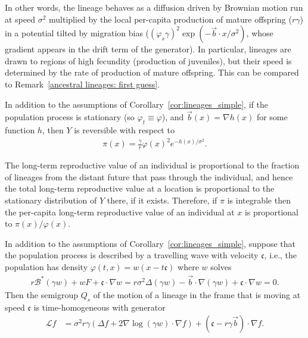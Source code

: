 \documentclass[EJP]{ejpecp} %
\newcommand{\grad}{\nabla}
\newcommand{\DG}{\mathcal{B}}  %
\newcommand{\meanq}{\vec b}    %
\newcommand{\wavespeed}{\mathfrak{c}}    %
\newcommand{\Lgen}{\mathcal{L}}    %
\newcommand{\comment}[1]{{\color{blue} \it #1}}
\begin{document}
In other words, 
the lineage behaves as a diffusion driven by Brownian motion 
run at speed $\sigma^2$ multiplied by the local per-capita production of 
mature offspring ($r \gamma$)
in a potential tilted by migration bias
($(\varphi_s \gamma)^2 \exp(-\meanq \cdot x / \sigma^2)$,
whose gradient appears in the drift term of the generator).
In particular, lineages are drawn to regions of high fecundity (production of juveniles), but their
speed is determined by the rate of production of mature offspring.
This can be compared to Remark~\ref{ancestral lineages: first guess}.

\begin{corollary} \label{cor:stationary_dist}
    In addition to the assumptions of Corollary~\ref{cor:lineages_simple},
    if the population process is stationary (so $\varphi_t \equiv \varphi$),
    and $\meanq(x) = \grad h(x)$ for some function $h$,
    then $Y$ is reversible with respect to
    \begin{align}
        \pi(x)
        =
        \frac{\gamma}{r} \varphi(x)^2 e^{-h(x) / \sigma^2} .
    \end{align}
\end{corollary}

The long-term reproductive value of an individual
is proportional to the fraction of lineages from the distant future that pass through the individual,
and hence the total long-term reproductive value at a location is proportional to
the stationary distribution of $Y$ there, if it exists.
Therefore,
if $\pi$ is integrable then the per-capita long-term reproductive value of an individual at $x$
is proportional to $\pi(x) / \varphi(x)$.

\begin{corollary} \label{cor:wavefront}
    In addition to the assumptions of Corollary~\ref{cor:lineages_simple},
    suppose that the population process is described by a travelling wave with 
velocity $\wavespeed$,
    i.e., the population has density
    $\varphi(t, x) = w(x - t \wavespeed)$
    where $w$ solves
    \begin{align*}
        r \DG^* (\gamma w) + w F + \wavespeed \cdot \grad w = 
r\sigma^2\Delta (\gamma w) -\meanq \cdot\grad (\gamma w) +\wavespeed \cdot \grad w =0 .
    \end{align*}
    Then the semigroup $Q_s$
    of the motion of a lineage in the frame that is moving at speed $\wavespeed$
    is time-homogeneous with generator
    \begin{align}
\label{Lgen}
        \Lgen f
        &=
        \sigma^2 r \gamma
        \left(
            \Delta f
            +
            2 \grad \log (\gamma w)
            \cdot \grad f
        \right)
        + (\wavespeed - r\gamma \meanq) \cdot \grad f .
    \end{align}
\end{corollary}
\end{document}
